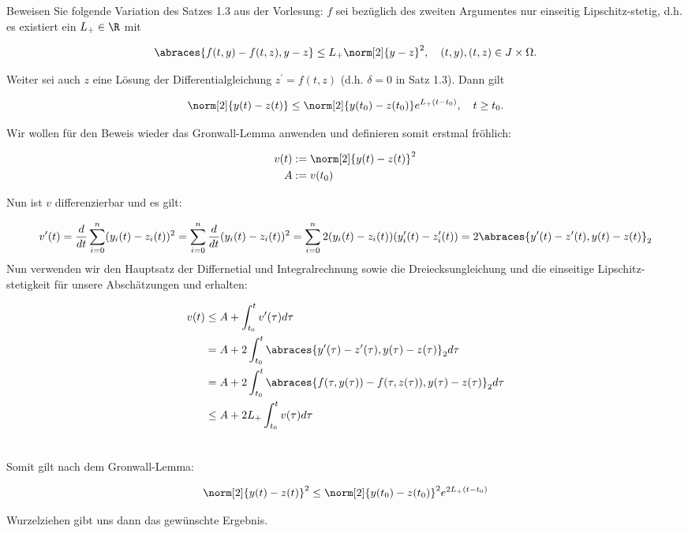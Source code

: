 \begin{exercise}

Beweisen Sie folgende Variation des Satzes 1.3 aus der Vorlesung:
$f$ sei bezüglich des zweiten Argumentes nur einseitig Lipschitz-stetig, d.h. es existiert ein $L_+ \in \R$ mit

\begin{align*}
  \abraces{f(t, y) - f(t, z), y - z}
  \leq
  L_+ \norm[2]{y - z}^2,
  \quad
  (t, y), (t, z) \in J \times \Omega.
\end{align*}

Weiter sei auch $z$ eine Lösung der Differentialgleichung $z^\prime = f(t, z)$ (d.h. $\delta = 0$ in Satz 1.3). Dann gilt

\begin{align*}
  \norm[2]{y(t) - z(t)}
  \leq
  \norm[2]{y(t_0) - z(t_0)} e^{L_+ (t - t_0)},
  \quad
  t \geq t_0.
\end{align*}

\end{exercise}

\begin{solution}

Wir wollen für den Beweis wieder das Gronwall-Lemma anwenden und definieren somit erstmal fröhlich:

\begin{align*}
  v(t)&:= \norm[2]{y(t)-z(t)}^{2}\\
  A &:= v(t_{0})
\end{align*}

Nun ist $v$ differenzierbar und es gilt:

\begin{align*}
  v'(t)=\frac{d}{dt}\sum_{i=0}^{n} (y_{i}(t)-z_{i}(t))^{2} =\sum_{i=0}^{n} \frac{d}{dt} (y_{i}(t)-z_{i}(t))^{2} =
  \sum_{i=0}^{n} 2(y_{i}(t)-z_{i}(t))(y'_{i}(t)-z'_{i}(t)) = 2 \abraces{y'(t)-z'(t),y(t)-z(t)}_2
\end{align*}
Nun verwenden wir den Hauptsatz der Differnetial und Integralrechnung sowie die Dreiecksungleichung und die einseitige
Lipschitz-stetigkeit für unsere Abschätzungen und erhalten:

\begin{align*}
  v(t) &\leq A + \int_{t_0}^{t} v'(\tau)d\tau \\
  &= A + 2\int_{t_0}^{t}\abraces{y'(\tau)-z'(\tau),y(\tau)-z(\tau)}_2d\tau \\
  &= A + 2\int_{t_0}^{t}\abraces{f(\tau,y(\tau))-f(\tau,z(\tau)),y(\tau)-z(\tau)}_2d\tau \\
  &\leq A +2L_{+}\int_{t_0}^tv(\tau)d\tau \\
  &\end{align*}

Somit gilt nach dem Gronwall-Lemma:

\begin{align*}
  \norm[2]{y(t)-z(t)}^{2} \leq \norm[2]{y(t_{0})-z(t_{0})}^{2}e^{2L_{+}(t-t_{0})}
\end{align*}

Wurzelziehen gibt uns dann das gewünschte Ergebnis.
\end{solution}
